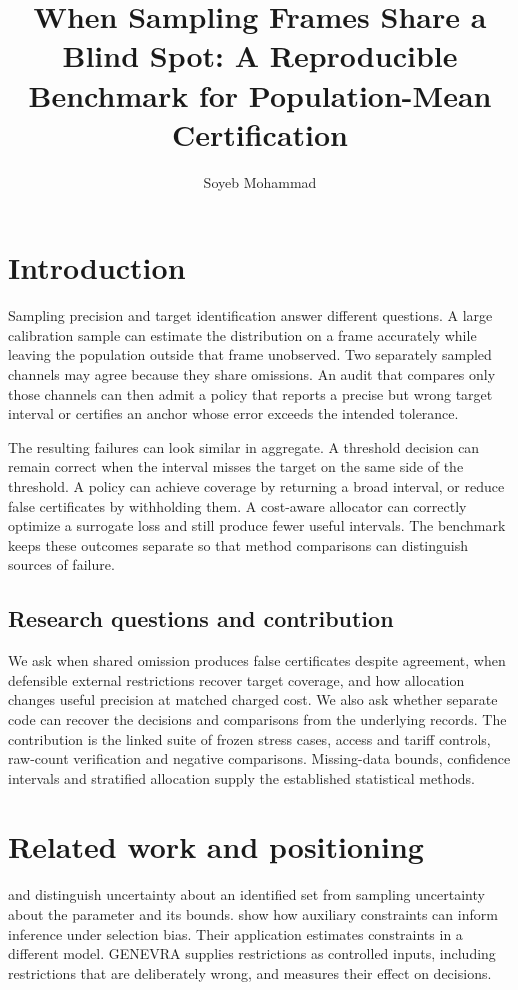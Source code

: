 \documentclass[article,nojss]{jss}
\author{Soyeb Mohammad}
\title{When Sampling Frames Share a Blind Spot: A Reproducible Benchmark for Population-Mean Certification}
\begin{document}
\section{Introduction}

Sampling precision and target identification answer different questions.
A large calibration sample can estimate the distribution on a frame
accurately while leaving the population outside that frame unobserved.
Two separately sampled channels may agree because they share omissions.
An audit that compares only those channels can then admit a policy that
reports a precise but wrong target interval or certifies an anchor whose
error exceeds the intended tolerance.

The resulting failures can look similar in aggregate. A threshold
decision can remain correct when the interval misses the target on the
same side of the threshold. A policy can achieve coverage by returning a
broad interval, or reduce false certificates by withholding them. A
cost-aware allocator can correctly optimize a surrogate loss and still
produce fewer useful intervals. The benchmark keeps these outcomes
separate so that method comparisons can distinguish sources of failure.

\subsection{Research questions and contribution}

We ask when shared omission produces false certificates despite
agreement, when defensible external restrictions recover target
coverage, and how allocation changes useful precision at matched charged
cost. We also ask whether separate code can recover the decisions and
comparisons from the underlying records. The contribution
is the linked suite of frozen stress cases, access and tariff controls,
raw-count verification and negative comparisons. Missing-data bounds,
confidence intervals and stratified allocation supply the established
statistical methods.

\section{Related work and positioning}

\citet{manski2005} and \citet{imbens2004}
distinguish uncertainty about an identified set from sampling
uncertainty about the parameter and its bounds. \citet{tudball2023} show how auxiliary constraints can inform inference
under selection bias. Their application estimates constraints in a
different model. GENEVRA supplies restrictions as controlled inputs,
including restrictions that are deliberately wrong, and measures their
effect on decisions.
\end{document}
